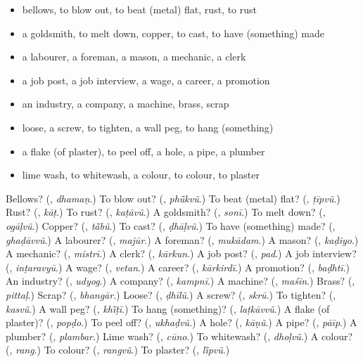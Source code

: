 \begin{itemize}
\raggedright
  \item bellows, to blow out, to beat (metal) flat, rust, to rust
  \item a goldsmith, to melt down, copper, to cast, to have (something) made
  \item a labourer, a foreman, a mason, a mechanic, a clerk
  \item a job post, a job interview, a wage, a career, a promotion
  \item an industry, a company, a machine, brass, scrap
  \item loose, a screw, to tighten, a wall peg, to hang (something)
  \item a flake (of plaster), to peel off, a hole, a pipe, a plumber
  \item lime wash, to whitewash, a colour, to colour, to plaster
\end{itemize}

\begin{tcolorbox}[breakable,colback=teal!4,colframe=teal!35!black,title={Before you move on}]
Bellows? (\textbf{}, \emph{dhamaṇ}.) To blow out? (\textbf{}, \emph{phū̃kvũ}.) To beat (metal) flat? (\textbf{}, \emph{ṭīpvũ}.) Rust? (\textbf{}, \emph{kāṭ}.) To rust? (\textbf{}, \emph{kaṭāvũ}.) A goldsmith? (\textbf{}, \emph{sonī}.) To melt down? (\textbf{}, \emph{ogāḷvũ}.) Copper? (\textbf{}, \emph{tā̃bũ}.) To cast? (\textbf{}, \emph{ḍhāḷvũ}.) To have (something) made? (\textbf{}, \emph{ghaḍāvvũ}.) A labourer? (\textbf{}, \emph{majūr}.) A foreman? (\textbf{}, \emph{mukādam}.) A mason? (\textbf{}, \emph{kaḍiyo}.) A mechanic? (\textbf{}, \emph{mistrī}.) A clerk? (\textbf{}, \emph{kārkun}.) A job post? (\textbf{}, \emph{pad}.) A job interview? (\textbf{}, \emph{inṭaravyū}.) A wage? (\textbf{}, \emph{vetan}.) A career? (\textbf{}, \emph{kārkirdī}.) A promotion? (\textbf{}, \emph{baḍhtī}.) An industry? (\textbf{}, \emph{udyog}.) A company? (\textbf{}, \emph{kampnī}.) A machine? (\textbf{}, \emph{maśīn}.) Brass? (\textbf{}, \emph{pittaḷ}.) Scrap? (\textbf{}, \emph{bhangār}.) Loose? (\textbf{}, \emph{ḍhīlũ}.) A screw? (\textbf{}, \emph{skrū}.) To tighten? (\textbf{}, \emph{kasvũ}.) A wall peg? (\textbf{}, \emph{khī̃ṭī}.) To hang (something)? (\textbf{}, \emph{laṭkāvvũ}.) A flake (of plaster)? (\textbf{}, \emph{popḍo}.) To peel off? (\textbf{}, \emph{ukhaḍvũ}.) A hole? (\textbf{}, \emph{kāṇũ}.) A pipe? (\textbf{}, \emph{pāīp}.) A plumber? (\textbf{}, \emph{plambar}.) Lime wash? (\textbf{}, \emph{cūno}.) To whitewash? (\textbf{}, \emph{dhoḷvũ}.) A colour? (\textbf{}, \emph{rang}.) To colour? (\textbf{}, \emph{rangvũ}.) To plaster? (\textbf{}, \emph{lī̃pvũ}.)
\end{tcolorbox}

